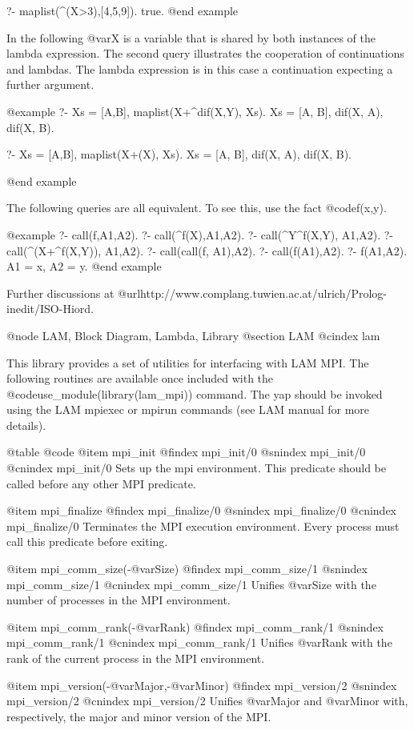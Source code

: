 {{{{{{{{?- maplist(\X^(X>3),[4,5,9]).
true.
@end example

In the following @var{X} is a variable that is shared by both instances
of the lambda expression. The second query illustrates the cooperation
of continuations and lambdas. The lambda expression is in this case a
continuation expecting a further argument.

@example
?- Xs = [A,B], maplist(X+\Y^dif(X,Y), Xs).
Xs = [A, B],
dif(X, A),
dif(X, B).

?- Xs = [A,B], maplist(X+\dif(X), Xs).
Xs = [A, B],
dif(X, A),
dif(X, B).

@end example

The following queries are all equivalent. To see this, use
the fact @code{f(x,y)}.

@example
?- call(f,A1,A2).
?- call(\X^f(X),A1,A2).
?- call(\X^Y^f(X,Y), A1,A2).
?- call(\X^(X+\Y^f(X,Y)), A1,A2).
?- call(call(f, A1),A2).
?- call(f(A1),A2).
?- f(A1,A2).
A1 = x,
A2 = y.
@end example

Further discussions
at @url{http://www.complang.tuwien.ac.at/ulrich/Prolog-inedit/ISO-Hiord}.


@node LAM, Block Diagram, Lambda, Library
@section LAM
@cindex lam

This library provides a set of utilities for interfacing with LAM MPI.
The following routines are available once included with the
@code{use_module(library(lam_mpi))} command. The yap should be
invoked using the LAM mpiexec or mpirun commands (see LAM manual for
more details).

@table @code
@item mpi_init
@findex mpi_init/0
@snindex mpi_init/0
@cnindex mpi_init/0
      Sets up the mpi environment. This predicate should be called before any other MPI predicate.

@item mpi_finalize
@findex mpi_finalize/0
@snindex mpi_finalize/0
@cnindex mpi_finalize/0
      Terminates the MPI execution environment. Every process must call this predicate before  exiting.

@item mpi_comm_size(-@var{Size})
@findex mpi_comm_size/1
@snindex mpi_comm_size/1
@cnindex mpi_comm_size/1
      Unifies @var{Size} with the number of processes in the MPI environment.


@item mpi_comm_rank(-@var{Rank})
@findex mpi_comm_rank/1
@snindex mpi_comm_rank/1
@cnindex mpi_comm_rank/1
      Unifies @var{Rank} with the rank of the current process in the MPI environment.

@item mpi_version(-@var{Major},-@var{Minor})
@findex mpi_version/2
@snindex mpi_version/2
@cnindex mpi_version/2
      Unifies @var{Major} and @var{Minor} with, respectively, the major and minor version of the MPI.


}}}}}}}}
